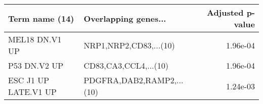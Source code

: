 \begin{tabular}{llr}
\toprule
      Term name (14) &      Overlapping genes... &  Adjusted p-value \\
\midrule
      MEL18 DN.V1 UP &    NRP1,NRP2,CD83,...(10) &          1.96e-04 \\
        P53 DN.V2 UP &     CD83,CA3,CCL4,...(10) &          1.96e-04 \\
ESC J1 UP LATE.V1 UP & PDGFRA,DAB2,RAMP2,...(10) &          1.24e-03 \\
\bottomrule
\end{tabular}
